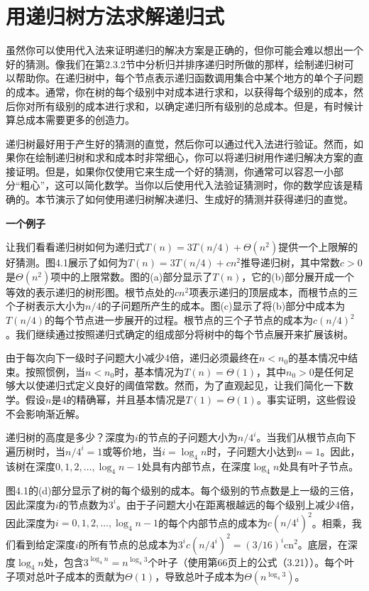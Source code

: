 \documentclass[lang=cn,newtx,10pt,scheme=chinese]{elegantbook}
\begin{document}
\section{用递归树方法求解递归式}

虽然你可以使用代入法来证明递归的解决方案是正确的，但你可能会难以想出一个好的猜测。像我们在第2.3.2节中分析归并排序递归时所做的那样，绘制递归树可以帮助你。在递归树中，每个节点表示递归函数调用集合中某个地方的单个子问题的成本。通常，你在树的每个级别中对成本进行求和，以获得每个级别的成本，然后你对所有级别的成本进行求和，以确定递归所有级别的总成本。但是，有时候计算总成本需要更多的创造力。

递归树最好用于产生好的猜测的直觉，然后你可以通过代入法进行验证。然而，如果你在绘制递归树和求和成本时非常细心，你可以将递归树用作递归解决方案的直接证明。但是，如果你仅使用它来生成一个好的猜测，你通常可以容忍一小部分“粗心”，这可以简化数学。当你以后使用代入法验证猜测时，你的数学应该是精确的。本节演示了如何使用递归树解决递归、生成好的猜测并获得递归的直觉。

\textbf{一个例子}

让我们看看递归树如何为递归式$T(n)=3 T(n / 4)+\Theta\left(n^2\right)$提供一个上限解的好猜测。图4.1展示了如何为$T(n)=3 T(n / 4)+c n^2$推导递归树，其中常数$c>0$是$\Theta\left(n^2\right)$项中的上限常数。图的(a)部分显示了$T(n)$，它的(b)部分展开成一个等效的表示递归的树形图。根节点处的$c n^2$项表示递归的顶层成本，而根节点的三个子树表示大小为$n / 4$的子问题所产生的成本。图(c)显示了将(b)部分中成本为$T(n / 4)$的每个节点进一步展开的过程。根节点的三个子节点的成本为$c(n / 4)^2$。我们继续通过按照递归式确定的组成部分将树中的每个节点展开来扩展该树。

由于每次向下一级时子问题大小减少4倍，递归必须最终在$n<n_0$的基本情况中结束。按照惯例，当$n<n_0$时，基本情况为$T(n)=\Theta(1)$，其中$n_0>0$是任何足够大以使递归式定义良好的阈值常数。然而，为了直观起见，让我们简化一下数学。假设$n$是4的精确幂，并且基本情况是$T(1)=\Theta(1)$。事实证明，这些假设不会影响渐近解。

递归树的高度是多少？深度为$i$的节点的子问题大小为$n / 4^i$。当我们从根节点向下遍历树时，当$n / 4^i=1$或等价地，当$i=\log _4 n$时，子问题大小达到$n=1$。因此，该树在深度$0,1,2,\ldots,\log _4 n-1$处具有内部节点，在深度$\log _4 n$处具有叶子节点。

图4.1的(d)部分显示了树的每个级别的成本。每个级别的节点数是上一级的三倍，因此深度为$i$的节点数为$3^i$。由于子问题大小在距离根越远的每个级别上减少4倍，因此深度为$i=0,1,2,\ldots,\log _4 n-1$的每个内部节点的成本为$c\left(n / 4^i\right)^2$。相乘，我们看到给定深度$i$的所有节点的总成本为$3^ic\left(n / 4^i\right)^2=(3 / 16)^i \mathrm{cn}^2$。底层，在深度$\log _4 n$处，包含$3^{\log _4 n}=n^{\log _4 3}$个叶子（使用第66页上的公式（3.21））。每个叶子项对总叶子成本的贡献为$\Theta(1)$，导致总叶子成本为$\Theta\left(n^{\log _4 3}\right)$。
\end{document}
